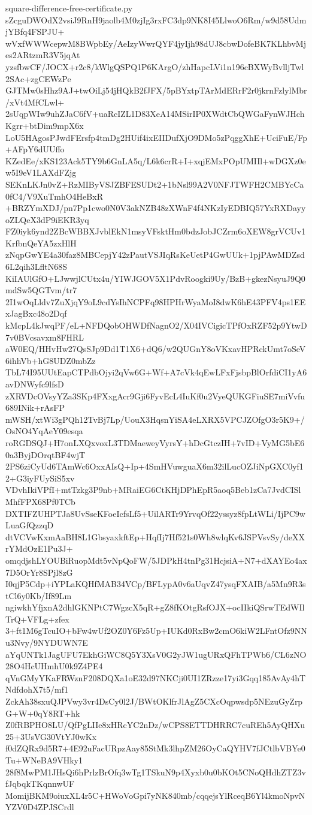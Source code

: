 \documentclass[11pt]{article}
\theoremstyle{definition}
\theoremstyle{remark}
\begin{document}
\begin{filecontents*}[overwrite]{square-difference-free-certificate.py}
sZcguDWOdX2vsiJ9RnH9jaolb4M0zjIg3rxFC3dp9NK8I45LlwoO6Rm/w9d58UdmjYBfq4FSPJU+
wVxfWWWcepwM8BWpbEy/AeIzyWwrQYF4jyIjh98dUJ8cbwDofeBK7KLhbvMjes2ARtzmR3V5jqAt
yzsfbwCF/JOCX+r2c8/kWlgQSPQ1P6KArgO/zhHapcLVi1n196cBXWyBvlljTwl2SAc+zgCEWzPe
GJTMw0sHhz9AJ+twOiLj54jHQkB2fJFX/5pBYxtpTArMdERrF2r0jkrnFzlylMbr/xVt4MfCLwl+
2sUqpWIw9uhZJaC6fV+uaRcIZL1D83XeA14MSirIP0XWdtCbQWGaFynWJHchKgrr+btDim9mpX6x
LoU5HAgosPJwdFErsfp4tmDg2HUif4ixEIIDufXjO9DMo5zPqggXhE+UciFuE/Fp+AFpY6dUUffo
KZedEe/xKS123Ack5TY9b6GnLA5q/L6k6crR+I+xqjEMxPOpUMIIl+wDGXz0ew5I9eV1LAXdFZjg
SEKnLKJn0vZ+RzMIByVSJZBFESUDt2+1bNsl99A2V0NFJTWFH2CMBYcCa0fC4/V9XuTmhO4HeBxR
+BRZYmXDJ/pn7Pp1cwo0N0V3akNZB48zXWnF4f4NKzIyEDBIQ57YxRXDayyoZLQeX3dP9iEKR3yq
FZ0iyk6ynd2ZBcWBBXJvblEkN1msyVFsktHm0bdzJobJCZrm6oXEW8grVCUv1KrfbnQeYA5zxHlH
zNqpGwYE4a30faz8MBCepjY42zPautVSJIqRsKeUetP4GwUUk+1pjPAwMDZsd6L2qih3LfltN68S
KiIAUlGfO+LJwwjlCUtx4u/YIWJGOV5X1PdvRoogki9Uy/BzB+gkezNsyuJ9Q0mdSw5QGTvm/tr7
2I1wOqLldv7ZuXjqY9oL9cdYsIhNCPFq98HPHrWyaMoI8dwK6hE43PFV4ps1EExJagBxc48o2Dqf
kMcpL4kJwqPF/eL+NFDQobOHWDfNagnO2/X04IVCigicTPfOxRZF52p9YtwD7v0BVcsavxm8FHRL
aW0EQ/HHvHw27QsSJp9Dd1T1X6+dQ6/w2QUGnY8oVKxavHPRckUmt7oSeV6ihhVb+hG8UDZ0mbZz
TbL74I95UUtEapCTPdbOjyi2qVw6G+Wf+A7cVk4qEwLFxFjsbpBlOrfdiCI1yA6avDNWyfc9lfsD
zXRVDcOVsyYZa3SKp4FXxgAcr9Gji6FyvEcL4IuKf0u2VyeQUKGFiuSE7miVvfu689INik+rAsFP
mWSH/xtWi3gPQh12TvBj7Lp/UouX3HqsnYiSA4eLXRX5VPCJZOfgO3r5K9+/OsNO4YqAeY09esqa
roRGDSQJ+H7onLXQxvoxL3TDMaeweyVyrsY+hDcGtczIH+7vID+VyMG5bE60a3ByjDOrqtBF4wjT
2PS6ziCyUd6TAmWc6OxxAIsQ+Ip+4SmHVuwguaX6m32ilLucOZJiNpGXC0yf12+G3iyFUySiS5xv
VDvhIkiVPfI+mtTzkg3P9nb+MRaiEG6CtKHjDPhEpR5aoq5Beb1zCa7JvdCISlMhfFPX68Pf0TCb
DXTIFZUHPTJa8UvSseKFoeIcfsLf5+UilARTr9YrvqOf22yssyz8fpLtWLi/IjPC9wLuaGfQzzqD
dtVCVwKxmAaBH8L1GbsyaxkftEp+HqfIj7Hf521s0Wh8wlqKv6JSPVsvSy/deXXrYMdOzE1Pu3J+
omqdjshLYOUBiRuopMdt5vNpQoFW/5JDPkH4tnPg31HcjsiA+N7+dXAYEo4ax7D5OrYr8SPjl8zG
I0qjP5Cdp+iYPLaKQHfMAB34VCp/BFLypA0v6aUqvZ47ysqFXAIB/a5Mn9R3stCl6y0Kb/If89Lm
ngiwkhYfjxnA2dhlGKNPtC7WgzcX5qR+gZ8fKOtgRsfOJX+ocIIkiQSrwTEdWIlTrQ+VFLg+zfex
3+ft1M6gTcuIO+bFw4wUf2OZ0Y6Fz5Up+IUKd0RxBw2cmO6kiW2LFntOfz9NNu3Nvy/9NYDUWN7E
aYqUNTk1JagUFU7EkhGiWC8Q5Y3XsV0G2yJW1ugURxQFhTPWb6/CL6zNO28O4HcUHmhU0k9Z4PE4
qVnGMyYKaFRWznF208DQXa1oE32d97NKCji0UI1ZRzze17yi3Gqq185AvAy4hTNdfdohX7t5/mf1
ZckAh38sxuQJPVwy3vr4DsCy0l2J/BWtOKlfrJlAgZ5CXcOqpwsdp5NEzuGyZrpG+W+0qY8RT+hk
Z0fRBPHO8LU/QfPgLIIe8xHRcYC2nDz/wCPS8ETTDHRRC7cuREh5AyQHXu25+3UsVG30VtYJ0wKx
f0dZQRx9d5R7+4E92uFacURpzAay85StMk3lhpZM26OyCaQYHV7fJCtlbVBYe0Tu+WNeBA9VHky1
28f8MwPM1JHsQi6hPrlzBrOfq3wTg1TSkuN9p4Xyxb0u0bKOt5CNoQHdhZTZ3vfJqbqkTKqnnwUF
MomijBKM9oiuxXL4r5C+HWoVoGpi7yNK840mb/cqqejsYlRceqB6Yl4kmoNpvNYZV0D4ZPJSCrdl

\end{filecontents*}
\end{document}
